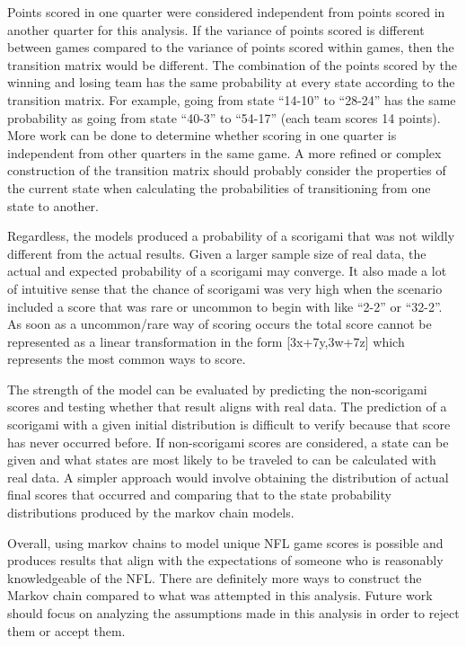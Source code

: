 \documentclass[
]{article}
\begin{document}
Points scored in one quarter were considered independent from points
scored in another quarter for this analysis. If the variance of points
scored is different between games compared to the variance of points
scored within games, then the transition matrix would be different. The
combination of the points scored by the winning and losing team has the
same probability at every state according to the transition matrix. For
example, going from state ``14-10'' to ``28-24'' has the same
probability as going from state ``40-3'' to ``54-17'' (each team scores
14 points). More work can be done to determine whether scoring in one
quarter is independent from other quarters in the same game. A more
refined or complex construction of the transition matrix should probably
consider the properties of the current state when calculating the
probabilities of transitioning from one state to another.

Regardless, the models produced a probability of a scorigami that was
not wildly different from the actual results. Given a larger sample size
of real data, the actual and expected probability of a scorigami may
converge. It also made a lot of intuitive sense that the chance of
scorigami was very high when the scenario included a score that was rare
or uncommon to begin with like ``2-2'' or ``32-2''. As soon as a
uncommon/rare way of scoring occurs the total score cannot be
represented as a linear transformation in the form {[}3x+7y,3w+7z{]}
which represents the most common ways to score.

The strength of the model can be evaluated by predicting the
non-scorigami scores and testing whether that result aligns with real
data. The prediction of a scorigami with a given initial distribution is
difficult to verify because that score has never occurred before. If
non-scorigami scores are considered, a state can be given and what
states are most likely to be traveled to can be calculated with real
data. A simpler approach would involve obtaining the distribution of
actual final scores that occurred and comparing that to the state
probability distributions produced by the markov chain models.

Overall, using markov chains to model unique NFL game scores is possible
and produces results that align with the expectations of someone who is
reasonably knowledgeable of the NFL. There are definitely more ways to
construct the Markov chain compared to what was attempted in this
analysis. Future work should focus on analyzing the assumptions made in
this analysis in order to reject them or accept them.
\end{document}
